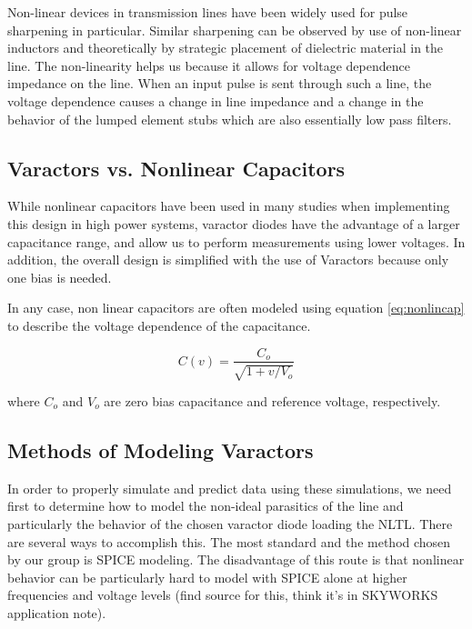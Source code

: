 \documentclass[journal]{IEEEtran}
\begin{document}
Non-linear devices in transmission lines have been widely used for pulse sharpening in particular. Similar sharpening can be observed by use of non-linear inductors and theoretically by strategic placement of dielectric material in the line\cite{wilson1991pulse}. The non-linearity helps us because it allows for voltage dependence impedance on the line. When an input pulse is sent through such a line, the voltage dependence causes a change in line impedance and a change in the behavior of the lumped element stubs which are also essentially low pass filters. 


\subsection{Varactors vs. Nonlinear Capacitors}

While nonlinear capacitors have been used in many studies \cite{FastHighVoltageNLTL} when implementing this design in high power systems, varactor diodes have the advantage of a larger capacitance range, and allow us to perform measurements using lower voltages. In addition, the overall design is simplified with the use of Varactors because only one bias is needed.  

In any case, non linear capacitors are often modeled using equation \ref{eq:nonlincap} to describe the voltage dependence of the capacitance\cite{nikoo2018theory}.


\begin{equation}\label{eq:nonlincap}
C(v) = \frac{C_{o}}{\sqrt{1+v/V_{o}}}
\end{equation}

where $C_{o}$ and $V_{o}$ are zero bias capacitance and reference voltage, respectively. 



\subsection{Methods of Modeling Varactors}
    In order to properly simulate and predict data using these simulations, we need first to determine how to model
    the non-ideal parasitics of the line and particularly the behavior of the chosen varactor diode loading the NLTL. 
    There are several ways to accomplish this. The most standard and the method chosen by our group is SPICE modeling. The disadvantage of this route is that nonlinear behavior can be particularly hard to model with SPICE alone at higher frequencies and voltage levels (find source for this, think it's in SKYWORKS application note).
    
\end{document}
